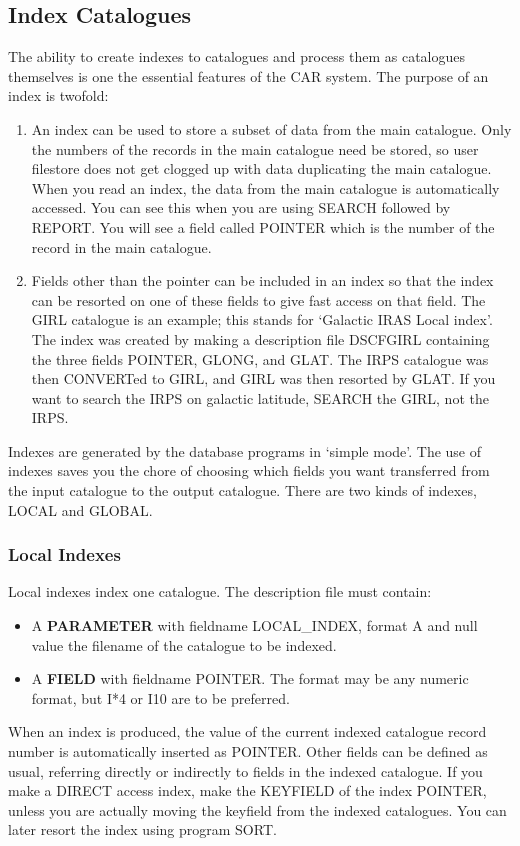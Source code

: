 \subsection {Index Catalogues}
The ability to create indexes to catalogues and process them as catalogues
themselves is one the essential features of the CAR system.
The purpose of an index is twofold:
\begin{enumerate}
\item An index can be used to store a subset of data from the main catalogue.
Only the numbers of the records in the main catalogue need be stored, so user
filestore does not get clogged up with data duplicating the main catalogue.
When you read an index, the data from the main catalogue is automatically
accessed.
You can see this when you are using SEARCH followed by REPORT.
You will see a field called POINTER which is the number of the record in the
main catalogue.
\item Fields other than the pointer can be included in an index so that the index
can be resorted on one of these fields to give fast access on that field.
The GIRL catalogue is an example; this stands for `Galactic IRAS Local index'.
The index was created by making a description file DSCFGIRL containing the three
fields POINTER, GLONG, and GLAT.
The IRPS catalogue was then CONVERTed to GIRL, and GIRL was then resorted by
GLAT.
If you want to search the IRPS on galactic latitude, SEARCH the GIRL, not the
IRPS.
\end{enumerate}
Indexes are generated by the database programs in `simple mode'.
The use of indexes saves you the chore of choosing which fields you want
transferred from the input catalogue to the output catalogue.
There are two kinds of indexes, LOCAL and GLOBAL.
\subsubsection {Local Indexes}
Local indexes index one catalogue.
The description file must contain:
\begin{itemize}
\item A {\bf PARAMETER} with fieldname LOCAL\_INDEX, format A and null value the
filename of the catalogue to be indexed.
\item A {\bf FIELD} with fieldname POINTER.
The format may be any numeric format, but I*4 or I10 are to be preferred.
\end{itemize}
When an index is produced, the value of the current indexed catalogue record
number is automatically inserted as POINTER.
Other fields can be defined as usual, referring directly or indirectly to
fields in the indexed catalogue.
If you make a DIRECT access index, make the KEYFIELD of the index POINTER,
unless you are actually moving the keyfield from the indexed catalogues.
You can later resort the index using program SORT.
